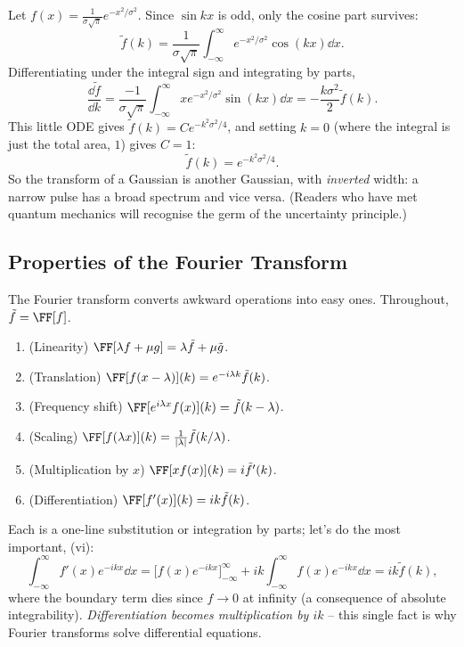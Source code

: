 \documentclass[a4paper]{scrartcl}
\begin{document}
\begin{example}
    Let $f(x) = \frac{1}{\sigma \sqrt{\pi}} e^{-x^2/\sigma^2}$. Since $\sin kx$ is odd, only the cosine part survives:
    $$
    \tilde{f}(k) = \frac{1}{\sigma \sqrt{\pi}}\int_{-\infty}^{\infty} e^{-x^2/\sigma^2} \cos (kx) \dd x.
    $$
    Differentiating under the integral sign and integrating by parts,
    $$
    \frac{\dd \tilde f}{\dd k} = \frac{-1}{\sigma \sqrt{\pi}} \int_{-\infty}^{\infty} x e^{-x^2/\sigma^2} \sin(kx) \dd x = -\frac{k \sigma^2}{2} \tilde{f}(k).
    $$
    This little ODE gives $\tilde{f}(k) = C e^{-k^2 \sigma^2/4}$, and setting $k = 0$ (where the integral is just the total area, $1$) gives $C = 1$:
    $$
    \tilde{f}(k) = e^{-k^2 \sigma^2 / 4}.
    $$
    So the transform of a Gaussian is another Gaussian, with \emph{inverted} width: a narrow pulse has a broad spectrum and vice versa. (Readers who have met quantum mechanics will recognise the germ of the uncertainty principle.)
\end{example}

\subsection{Properties of the Fourier Transform}

The Fourier transform converts awkward operations into easy ones. Throughout, $\tilde{f} = \FF[f]$.
\begin{enumerate}[label=(\roman*)]
    \item (Linearity) $\FF[\lambda f + \mu g] = \lambda \tilde f + \mu \tilde g$.
    \item (Translation) $\FF[f(x - \lambda)](k) = e^{-i \lambda k} \tilde{f}(k)$.
    \item (Frequency shift) $\FF[e^{i \lambda x} f(x)](k) = \tilde{f}(k - \lambda)$.
    \item (Scaling) $\FF[f(\lambda x)](k) = \frac{1}{\abs{\lambda}} \tilde{f}(k/\lambda)$.
    \item (Multiplication by $x$) $\FF[x f(x)](k) = i \tilde{f}'(k)$.
    \item (Differentiation) $\FF[f'(x)](k) = ik \tilde{f}(k)$.
\end{enumerate}
Each is a one-line substitution or integration by parts; let's do the most important, (vi):
$$
\int_{-\infty}^{\infty} f'(x) e^{-ikx}\dd x = \Big[f(x) e^{-ikx}\Big]_{-\infty}^{\infty} + ik \int_{-\infty}^{\infty} f(x) e^{-ikx} \dd x = i k \tilde{f}(k),
$$
where the boundary term dies since $f \to 0$ at infinity (a consequence of absolute integrability). \emph{Differentiation becomes multiplication by $ik$} -- this single fact is why Fourier transforms solve differential equations.
\end{document}
